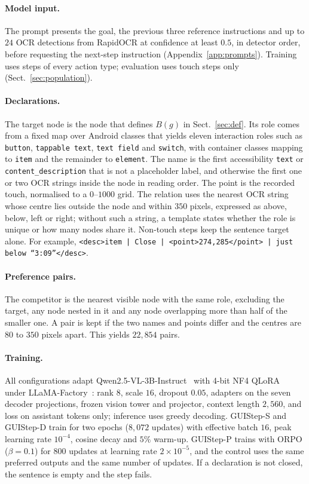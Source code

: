 \documentclass[runningheads,a4paper]{llncs}
\begin{document}
\paragraph{Model input.}
The prompt presents the goal, the previous three reference instructions and up to $24$ OCR
detections from RapidOCR at confidence at least $0.5$, in detector order, before requesting the
next-step instruction (Appendix~\ref{app:prompts}). Training uses steps of every action type; evaluation uses touch steps only (Sect.~\ref{sec:population}).

\paragraph{Declarations.}
The target node is the node that defines $B(g)$ in Sect.~\ref{sec:def}. Its
role comes from a fixed map over Android classes that yields eleven interaction roles such as
\texttt{button}, \texttt{tappable text}, \texttt{text field} and \texttt{switch}, with container
classes mapping to \texttt{item} and the remainder to \texttt{element}. The name is the first accessibility \texttt{text} or \texttt{content\_description} that is not a placeholder label, and otherwise the first one or
two OCR strings inside the node in reading order. The point is the recorded touch, normalised to a $0$--$1000$ grid. The
relation uses the nearest OCR string whose centre lies outside the node and within $350$ pixels,
expressed as above, below, left or right; without such a string, a template states whether the
role is unique or how many nodes share it. Non-touch steps keep the sentence target alone. For
example, \texttt{<desc>item | Close | <point>274,285</point> | just below ``3:09''</desc>}.

\paragraph{Preference pairs.}
The competitor is the nearest visible node with the same role, excluding the target, any node
nested in it and any node overlapping more than half of the smaller one. A pair is kept if the two
names and points differ and the centres are $80$ to $350$ pixels apart. This yields $22{,}854$
pairs.

\paragraph{Training.}
All configurations adapt Qwen2.5-VL-3B-Instruct~\cite{qwen25vl} with 4-bit NF4
QLoRA~\cite{lora,qlora} under LLaMA-Factory~\cite{llamafactory}: rank $8$, scale $16$, dropout
$0.05$, adapters on the seven decoder projections, frozen vision tower and projector, context
length $2{,}560$, and loss on assistant tokens only; inference uses greedy decoding. \mbox{GUIStep-S} and \mbox{GUIStep-D} train
for two epochs ($8{,}072$ updates) with effective batch $16$, peak learning rate $10^{-4}$, cosine
decay and $5\%$ warm-up. \mbox{GUIStep-P} trains with ORPO ($\beta=0.1$) for $800$ updates at learning
rate $2\times10^{-5}$, and the control uses the same preferred outputs and the same number of updates. If a declaration is not closed, the sentence is empty and the step fails.
\end{document}
